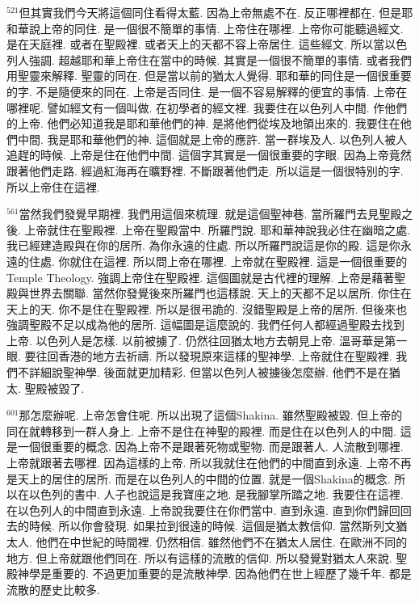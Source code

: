 \documentclass{book}
\begin{document}
$^{521}$但其實我們今天將這個同住看得太藍.
因為上帝無處不在.
反正哪裡都在.
但是耶和華說上帝的同住.
是一個很不簡單的事情.
上帝住在哪裡.
上帝你可能聽過經文.
是在天庭裡.
或者在聖殿裡.
或者天上的天都不容上帝居住.
這些經文.
所以當以色列人強調.
超越耶和華上帝住在當中的時候.
其實是一個很不簡單的事情.
或者我們用聖靈來解釋.
聖靈的同在.
但是當以前的猶太人覺得.
耶和華的同住是一個很重要的字.
不是隨便來的同在.
上帝是否同住.
是一個不容易解釋的便宜的事情.
上帝在哪裡呢.
譬如經文有一個叫做.
在初學者的經文裡.
我要住在以色列人中間.
作他們的上帝.
他們必知道我是耶和華他們的神.
是將他們從埃及地領出來的.
我要住在他們中間.
我是耶和華他們的神.
這個就是上帝的應許.
當一群埃及人.
以色列人被人追趕的時候.
上帝是住在他們中間.
這個字其實是一個很重要的字眼.
因為上帝竟然跟著他們走路.
經過紅海再在曠野裡.
不斷跟著他們走.
所以這是一個很特別的字.
所以上帝住在這裡.

$^{561}$當然我們發覺早期裡.
我們用這個來梳理.
就是這個聖神巷.
當所羅門去見聖殿之後.
上帝就住在聖殿裡.
上帝在聖殿當中.
所羅門說.
耶和華神說我必住在幽暗之處.
我已經建造殿與在你的居所.
為你永遠的住處.
所以所羅門說這是你的殿.
這是你永遠的住處.
你就住在這裡.
所以問上帝在哪裡.
上帝就在聖殿裡.
這是一個很重要的Temple Theology.
強調上帝住在聖殿裡.
這個圖就是古代裡的理解.
上帝是藉著聖殿與世界去關聯.
當然你發覺後來所羅門也這樣說.
天上的天都不足以居所.
你住在天上的天.
你不是住在聖殿裡.
所以是很弔詭的.
沒錯聖殿是上帝的居所.
但後來也強調聖殿不足以成為他的居所.
這幅圖是這麼說的.
我們任何人都經過聖殿去找到上帝.
以色列人是怎樣.
以前被擄了.
仍然往回猶太地方去朝見上帝.
溫哥華是第一眼.
要往回香港的地方去祈禱.
所以發現原來這樣的聖神學.
上帝就住在聖殿裡.
我們不詳細說聖神學.
後面就更加精彩.
但當以色列人被擄後怎麼辦.
他們不是在猶太.
聖殿被毀了.

$^{601}$那怎麼辦呢.
上帝怎會住呢.
所以出現了這個Shakina.
雖然聖殿被毀.
但上帝的同在就轉移到一群人身上.
上帝不是住在神聖的殿裡.
而是住在以色列人的中間.
這是一個很重要的概念.
因為上帝不是跟著死物或聖物.
而是跟著人.
人流散到哪裡.
上帝就跟著去哪裡.
因為這樣的上帝.
所以我就住在他們的中間直到永遠.
上帝不再是天上的居住的居所.
而是在以色列人的中間的位置.
就是一個Shakina的概念.
所以在以色列的書中.
人子也說這是我寶座之地.
是我腳掌所踏之地.
我要住在這裡.
在以色列人的中間直到永遠.
上帝說我要住在你們當中.
直到永遠.
直到你們歸回回去的時候.
所以你會發現.
如果拉到很遠的時候.
這個是猶太教信仰.
當然斯列文猶太人.
他們在中世紀的時間裡.
仍然相信.
雖然他們不在猶太人居住.
在歐洲不同的地方.
但上帝就跟他們同在.
所以有這樣的流散的信仰.
所以發覺對猶太人來說.
聖殿神學是重要的.
不過更加重要的是流散神學.
因為他們在世上經歷了幾千年.
都是流散的歷史比較多.
\end{document}
